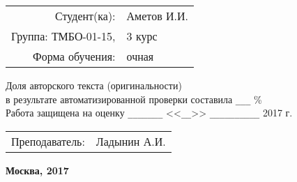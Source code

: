 \begin{titlepage}
\vspace{15pt}

	\begin{flushright}
	  \begin{tabular}{rl}
            Студент(ка): & Аметов И.И. \\
	    Группа: ТМБО-01-15, & 3 курс \\
	    Форма обучения: & очная \\
		\end{tabular}
	\end{flushright}

\begin{center}
Доля авторского текста (оригинальности) \\
в результате автоматизированной проверки составила \verb|___| \% \\
Работа защищена на оценку \verb|_______| <<\verb|__|>> \verb|__________| 2017 г.
\end{center}

\vspace{1pt}

	\begin{flushright}
	  \begin{tabular}{rl}
            Преподаватель: & Ладынин А.И. \\
	  \end{tabular}
	\end{flushright}

\vfill

	\begin{center} %
		\bfseries
		Москва, 2017
	\end{center}
	
\end{titlepage} 

